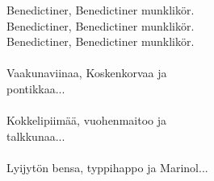 
            Benedictiner, Benedictiner munklikör. \\
            Benedictiner, Benedictiner munklikör. \\
            Benedictiner, Benedictiner munklikör. \\
\hspace{10mm} \\
            Vaakunaviinaa, Koskenkorvaa ja \\
            pontikkaa... \\
\hspace{10mm} \\
            Kokkelipiimää, vuohenmaitoo ja \\
            talkkunaa... \\
\hspace{10mm} \\
            Lyijytön bensa, typpihappo ja Marinol... \\
